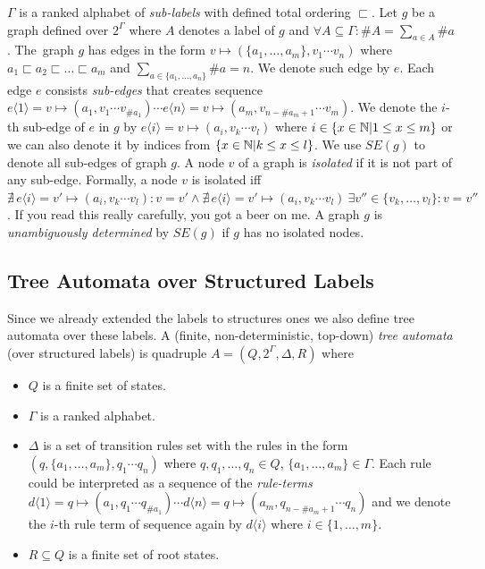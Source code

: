 $\Gamma$ is a ranked alphabet of \emph{sub-labels} with defined total ordering $\sqsubset$.
Let $g$ be a graph defined over $2^\Gamma$ where $A$ denotes a label of $g$ and $\forall A \subseteq \Gamma: \#A = \sum_{a\in A} \#a$.
The~graph $g$ has edges in the form $v \mapsto (\{a_1,\ldots,a_m\},v_1 \cdots v_n)$ where
$a_1 \sqsubset a_2 \sqsubset \ldots \sqsubset a_m$ and $\sum_{a \in \{a_1,\ldots,a_n\}} \# a = n$.
We denote such edge by $e$.
Each edge $e$ consists \emph{sub-edges} that creates sequence
$e\langle 1\rangle = v \mapsto (a_1,v_1 \cdots v_{\#a_1}) \cdots e\langle n\rangle= v \mapsto (a_m,v_{n-\#a_m+1} \cdots v_m)$.
We denote the $i$-th sub-edge of $e$ in $g$ by $e\langle i\rangle = v \mapsto (a_i,v_k \cdots v_l)$ where $i \in \{x \in \mathbb{N} | 1 \leq x \leq m\}$ or
we can also denote it by indices from $\{x \in \mathbb{N} | k \leq x \leq l\}$.
We use $SE(g)$ to denote all sub-edges of graph $g$.
A node $v$ of a graph is \emph{isolated} if it is not part of any sub-edge.
Formally, a node $v$ is isolated
iff $\nexists\, e\langle i\rangle = v' \mapsto (a_i,v_k \cdots v_l): v = v' \wedge \nexists\, e\langle i\rangle = v' \mapsto (a_i,v_k \cdots v_l)\ \exists v'' \in \{v_k,\ldots, v_l\}: v = v''$.
If you read this really carefully, you got a beer on me. %
A graph $g$ is \emph{unambiguously determined} by $SE(g)$ if $g$ has no isolated nodes.

\subsection{Tree Automata over Structured Labels}

Since we already extended the labels to structures ones we also define tree automata over these labels.
A (finite, non-deterministic, top-down) \emph{tree automata} (over structured labels) is quadruple $A=(Q,2^\Gamma, \Delta, R)$ where
\begin{itemize}
	\item $Q$ is a finite set of states.
	\item $\Gamma$ is a ranked alphabet.
	\item $\Delta$ is a set of transition rules set with the rules in the form
		$(q,\{a_1,\ldots,a_m\},q_1 \cdots q_n)$
		where $q,q_1,\ldots,q_n \in Q$, $\{a_1,\ldots,a_m\} \in \Gamma$.
	Each rule could be interpreted as a sequence of the \emph{rule-terms}
	$d\langle 1\rangle = q \mapsto (a_1,q_1 \cdots q_{\#a_1}) \cdots d\langle n\rangle= q \mapsto (a_m,q_{n-\#a_m+1} \cdots q_n)$ and
	we denote the $i$-th rule term of sequence again by $d\langle i\rangle$ where $i \in \{1,\ldots,m\}$.
	\item $R\subseteq Q$ is a finite set of root states.
\end{itemize}

